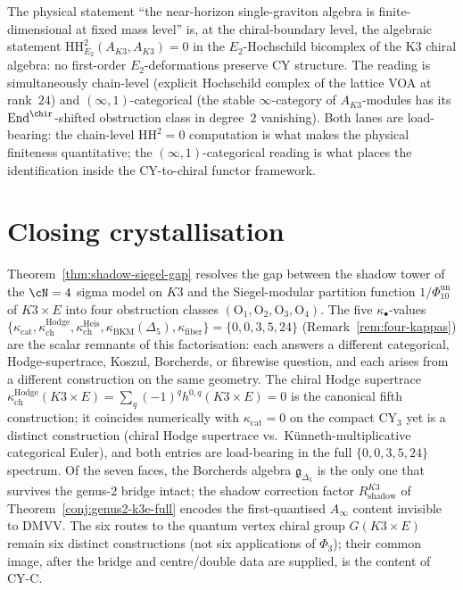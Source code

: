 \begin{remark}[Graviton finiteness \texorpdfstring{$=$}{=} \texorpdfstring{$\mathrm{HH}^2_{E_2}$}{HH-2-E-2}-vanishing]
\label{rem:k3e-cy3-platonic-graviton-HH2}
The physical statement ``the near-horizon single-graviton algebra is finite-dimensional at fixed mass level'' is, at the chiral-boundary level, the algebraic statement $\mathrm{HH}^2_{E_2}(A_{K3}, A_{K3}) = 0$ in the $E_2$-Hochschild bicomplex of the K3 chiral algebra: no first-order $E_2$-deformations preserve CY structure. The reading is simultaneously chain-level (explicit Hochschild complex of the lattice VOA at rank~$24$) and $(\infty, 1)$-categorical (the stable $\infty$-category of $A_{K3}$-modules has its $\mathrm{End}^{\chir}$-shifted obstruction class in degree~$2$ vanishing). Both lanes are load-bearing: the chain-level $\mathrm{HH}^2 = 0$ computation is what makes the physical finiteness quantitative; the $(\infty, 1)$-categorical reading is what places the identification inside the CY-to-chiral functor framework.
\end{remark}

\section*{Closing crystallisation}
\label{sec:k3e-cy3-closing-crystallisation}

Theorem~\ref{thm:shadow-siegel-gap} resolves the gap between
the shadow tower of the $\cN = 4$ sigma model on $K3$ and the
Siegel-modular partition function \(1/\Phi_{10}^{\mathrm{un}}\) of \(K3 \times E\)
into four obstruction classes
$(\mathrm{O}_1, \mathrm{O}_2, \mathrm{O}_3, \mathrm{O}_4)$.
The five $\kappa_\bullet$-values
$\{\kappa_{\mathrm{cat}}, \kappa_{\mathrm{ch}}^{\mathrm{Hodge}},
\kappa_{\mathrm{ch}}^{\mathrm{Heis}}, \kappa_{\mathrm{BKM}}(\Delta_5),
\kappa_{\mathrm{fiber}}\} = \{0, 0, 3, 5, 24\}$
\textup{(}Remark~\ref{rem:four-kappas}\textup{)} are the scalar
remnants of this factorisation: each answers a different
categorical, Hodge-supertrace, Koszul, Borcherds, or fibrewise
question, and each arises from a different construction on the
same geometry. The chiral Hodge supertrace
$\kappa_{\mathrm{ch}}^{\mathrm{Hodge}}(K3 \times E) =
\sum_q (-1)^q h^{0,q}(K3 \times E) = 0$ is the canonical fifth
construction; it coincides numerically with $\kappa_{\mathrm{cat}} = 0$
on the compact CY$_3$ yet is a distinct construction (chiral Hodge
supertrace vs.\ K\"unneth-multiplicative categorical Euler), and
both entries are load-bearing in the full $\{0, 0, 3, 5, 24\}$
spectrum. Of the seven faces, the Borcherds algebra
$\mathfrak{g}_{\Delta_5}$ is the only one that survives the
genus-$2$ bridge intact; the shadow correction factor
$R_{\mathrm{shadow}}^{K3}$ of
Theorem~\ref{conj:genus2-k3e-full} encodes the first-quantised
$A_\infty$ content invisible to DMVV. The six routes to the quantum
vertex chiral group $G(K3 \times E)$ remain six distinct constructions
\textup{(}not six applications of $\Phi_3$\textup{)}; their
common image, after the bridge and centre/double data are supplied, is
the content of CY-C.



